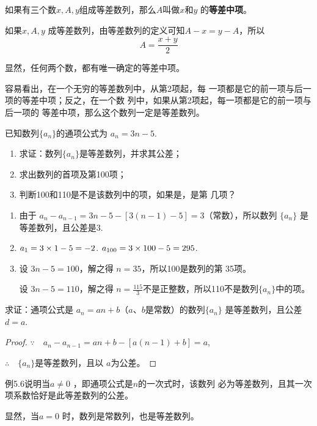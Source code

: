 如果有三个数$x,A,y$组成等差数列，那么$A$叫做$x$和$y$
的\textbf{等差中项}。

如果$x,A,y$
成等差数列，由等差数列的定义可知$A-x=y-A$，所以
\[A=\frac{x+y}{2}\]

显然，任何两个数，都有唯一确定的等差中项。

容易看出，在一个无穷的等差数列中，从第2项起，每
一项都是它的前一项与后一项的等差中项；反之，在一个数
列中，如果从第2项起，每一项都是它的前一项与后一项的
等差中项，那么这个数列一定是等差数列。

\begin{example}
已知数列$\{a_n\}$的通项公式为
$a_n=3n-5$.
\begin{enumerate}[(1)]
\item 求证：数列$\{a_n\}$是等差数列，并求其公差；
\item 求出数列的首项及第100项；
\item 判断100和110是不是该数列中的项，如果是，是第
几项？
\end{enumerate}
\end{example}

\begin{solution}
\begin{enumerate}[(1)]
    \item 由于
    $a_n-a_{n-1}=3n-5-[3(n-1)-5]=3$（常数），所以数列
    $\{a_n\}$
    是等差数列，且公差是3.
\item $a_1=3\times1-5=-2$. $a_{100}=3\times100-5=295$.
\item 设
    $3n-5=100$，解之得
    $n=35$，所以100是数列的第
    35项。

    设
    $3n-5=110$，解之得
    $n=\frac{115}{3}$不是正整数，所以110不是数列$\{a_n\}$中的项。
\end{enumerate}
\end{solution}

\begin{example}
    求证：通项公式是
$a_n=an+b$（$a$、$b$是常数）的数列$\{a_n\}$
是等差数列，且公差
$d=a$.
\end{example}

\begin{proof}
$\because\quad a_n-a_{n-1}=an+b-[a(n-1)+b]=a$,

$\therefore\quad \{a_n\}$是等差数列，且以
$a$为公差。
\end{proof}

例5.6说明当$a\ne 0$
，即通项公式是$n$的一次式时，该数列
必为等差数列，且其一次项系数恰好是此等差数列的公差。

显然，当$a=0$
时，数列是常数列，也是等差数列。

